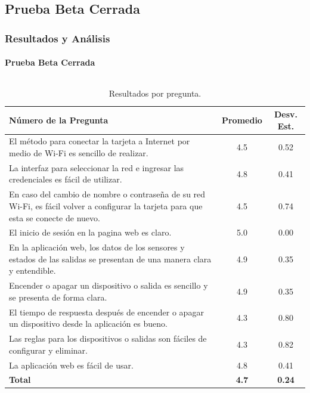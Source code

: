 \subsection{Prueba Beta Cerrada}
\begin{frame}[t]
\frametitle{Resultados y Análisis}
\framesubtitle{Prueba Beta Cerrada}
\footnotesize 
\begin{columns}
	\column{\dimexpr\paperwidth-10pt}
\begin{table}[H]
	\begin{center}
		\caption{Resultados por pregunta.}
		\label{table:enc}
		\begin{tabular}{|p{11cm}|c|c|}
			\hline 
			\textbf{Número de la Pregunta} & \textbf{Promedio} & \textbf{Desv. Est.}\\ 
			\hline 
			{\tiny El método para conectar la tarjeta a Internet por medio de Wi-Fi es sencillo de realizar.} & 4.5 & 0.52\\ 
			\hline 
			{\tiny La interfaz para seleccionar la red e ingresar las credenciales es fácil de utilizar.} & 4.8 & 0.41\\ 
			\hline 
			{\tiny En caso del cambio de nombre o contraseña de su red Wi-Fi, es fácil volver a configurar la tarjeta para que esta se conecte de nuevo.} & 4.5 & 0.74\\ 
			\hline 
			{\tiny El inicio de sesión en la pagina web es claro.} & 5.0 & 0.00\\ 
			\hline 
			{\tiny En la aplicación web, los datos de los sensores y estados de las salidas se presentan de una manera clara y entendible.} & 4.9 & 0.35\\ 
			\hline 
			{\tiny Encender o apagar un dispositivo o salida es sencillo y se presenta de forma clara.} & 4.9 & 0.35\\ 
			\hline 
			{\tiny El tiempo de respuesta después de encender o apagar un dispositivo desde la aplicación es bueno.} & 4.3 & 0.80\\ 
			\hline 
			{\tiny Las reglas para los dispositivos o salidas son fáciles de configurar y eliminar.} & 4.3 & 0.82\\ 
			\hline 
			{\tiny La aplicación web es fácil de usar.} & 4.8 & 0.41\\ 
			\hline 
			\textbf{Total} & \textbf{4.7} & \textbf{0.24}\\ 
			\hline 
		\end{tabular} 
	\end{center}
\end{table}
\end{columns}

\end{frame}